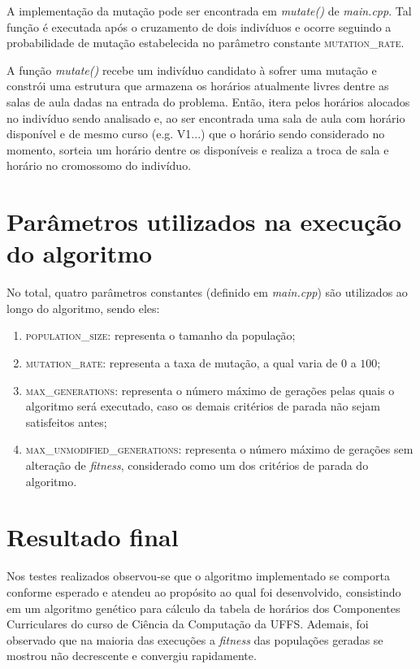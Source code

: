 \documentclass[12pt]{article}
\begin{document}
A implementação da mutação pode ser encontrada em \emph{mutate()} de \emph{main.cpp}. Tal função é executada após o cruzamento de dois indivíduos e ocorre seguindo a probabilidade de mutação estabelecida no parâmetro constante \textsc{mutation\_rate}.

A função \emph{mutate()} recebe um indivíduo candidato à sofrer uma mutação e constrói uma estrutura que armazena os horários atualmente livres dentre as salas de aula dadas na entrada do problema. Então, itera pelos horários alocados no indivíduo sendo analisado e, ao ser encontrada uma sala de aula com horário disponível e de mesmo curso (e.g. V1...) que o horário sendo considerado no momento, sorteia um horário dentre os disponíveis e realiza a troca de sala e horário no cromossomo do indivíduo.

\section{Parâmetros utilizados na execução do algoritmo}

No total, quatro parâmetros constantes (definido em \emph{main.cpp}) são utilizados ao longo do algoritmo, sendo eles:

\begin{enumerate}
    \item \textsc{population\_size}: representa o tamanho da população;
    \item \textsc{mutation\_rate}: representa a taxa de mutação, a qual varia de $0$ a $100$;
    \item \textsc{max\_generations}: representa o número máximo de gerações pelas quais o algoritmo será executado, caso os demais critérios de parada não sejam satisfeitos antes;
    \item \textsc{max\_unmodified\_generations}: representa o número máximo de gerações sem alteração de \textit{fitness}, considerado como um dos critérios de parada do algoritmo.
\end{enumerate}

\section{Resultado final}

Nos testes realizados observou-se que o algoritmo implementado se comporta conforme esperado e atendeu ao propósito ao qual foi desenvolvido, consistindo em um algoritmo genético para cálculo da tabela de horários dos Componentes Curriculares do curso de Ciência da Computação da UFFS. Ademais, foi observado que na maioria das execuções a \textit{fitness} das populações geradas se mostrou não decrescente e convergiu rapidamente.

% 
% 
\end{document}
